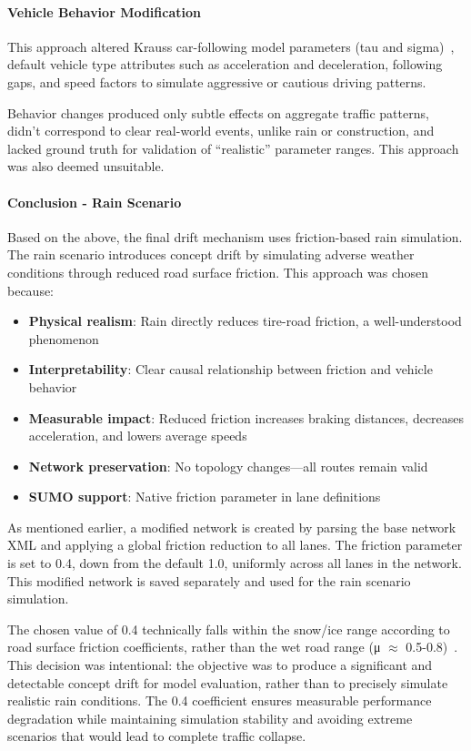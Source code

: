 \paragraph{Vehicle Behavior Modification}
This approach altered Krauss car-following model parameters (tau and sigma)~\cite{krauss1998carfollowing}, default vehicle type attributes such as acceleration and deceleration, following gaps, and speed factors to simulate aggressive or cautious driving patterns.

Behavior changes produced only subtle effects on aggregate traffic patterns, didn't correspond to clear real-world events, unlike rain or construction, and lacked ground truth for validation of ``realistic'' parameter ranges. This approach was also deemed unsuitable.

\paragraph{Conclusion - Rain Scenario}
Based on the above, the final drift mechanism uses friction-based rain simulation.
The rain scenario introduces concept drift by simulating adverse weather conditions through reduced road surface friction. This approach was chosen because:
\begin{itemize}
    \item \textbf{Physical realism}: Rain directly reduces tire-road friction, a well-understood phenomenon
    \item \textbf{Interpretability}: Clear causal relationship between friction and vehicle behavior
    \item \textbf{Measurable impact}: Reduced friction increases braking distances, decreases acceleration, and lowers average speeds
    \item \textbf{Network preservation}: No topology changes—all routes remain valid
    \item \textbf{SUMO support}: Native friction parameter in lane definitions
\end{itemize}

As mentioned earlier, a modified network is created by parsing the base network XML and applying a global friction reduction to all lanes.
The friction parameter is set to 0.4, down from the default 1.0, uniformly across all lanes in the network.
This modified network is saved separately and used for the rain scenario simulation.

The chosen value of 0.4 technically falls within the snow/ice range according to road surface friction coefficients, rather than the wet road range (μ $\approx$ 0.5-0.8)~\cite{sumo2019friction}.
This decision was intentional: the objective was to produce a significant and detectable concept drift for model evaluation, rather than to precisely simulate realistic rain conditions.
The 0.4 coefficient ensures measurable performance degradation while maintaining simulation stability and avoiding extreme scenarios that would lead to complete traffic collapse.

